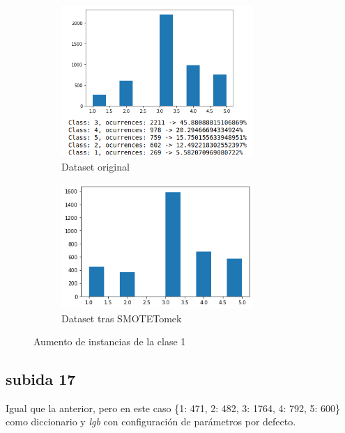 \begin{figure}[H]

\begin{subfigure}{.5\textwidth}
  \centering
  \includegraphics[width=0.8\textwidth]{imagenes/classes.png}
  \caption{Dataset original}
  \label{fig:sfig1}
\end{subfigure}%
\begin{subfigure}{.5\textwidth}
  \centering
  \includegraphics[width=0.8\textwidth]{imagenes/sub16-bal.png}
  \caption{Dataset tras SMOTETomek}
  \label{fig:sfig2}
\end{subfigure}

\caption{Aumento de instancias de la clase 1}
\label{fig:fig}
\end{figure}

\subsection{subida 17}

Igual que la anterior, pero en este caso \{1: 471, 2: 482, 3: 1764, 4: 792, 5: 600\} como diccionario y \textit{lgb} con configuración de parámetros por defecto.

